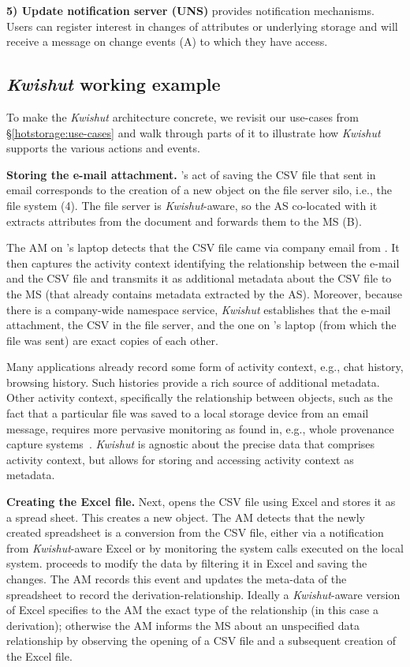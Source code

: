 \noindent\textbf{5) Update notification server (UNS)}
provides notification mechanisms. Users can register interest in changes of
attributes or underlying storage and will receive a message on change events (A)
to which they have access.

\subsection{\emph{Kwishut} working example}

To make the \emph{Kwishut} architecture concrete, we revisit our use-cases from
\S\ref{hotstorage:use-cases} and walk through parts of it to illustrate how \emph{Kwishut}
supports the various actions and events.

\noindent\textbf{Storing the e-mail attachment.}
\persa's act of saving the CSV file that \persc sent in email corresponds to the creation of a new object on the file server silo, i.e., the file system (4). The file server is \emph{Kwishut}-aware, so the AS co-located with it extracts attributes from the document and forwards them to the MS (B).

The AM on \persa's laptop detects that the CSV file came via company email from
\persc. It then captures the activity context identifying the relationship
between the e-mail and the CSV file and transmits it as additional metadata
about the CSV file to the MS (that already contains metadata extracted by the
AS). Moreover, because there is a company-wide namespace service, \emph{Kwishut}
establishes that the e-mail attachment, the CSV in the file server, and the one
on \persc's laptop (from which the file was sent) are exact copies of each
other.

Many applications already record some form of activity context, e.g., chat
history, browsing history. Such histories provide a rich source of additional
metadata. Other activity context, specifically the relationship between objects,
such as the fact that a particular file was saved to a local storage device from
an email message, requires more pervasive monitoring as found in, e.g., whole
provenance capture systems~\cite{camflow}. \emph{Kwishut} is agnostic about the precise
data that comprises activity context, but allows for storing and accessing
activity context as metadata.

\noindent\textbf{Creating the Excel file.}
Next, \persa opens the CSV file using Excel and stores it as a spread sheet.
This creates a new object. The AM detects that the newly created spreadsheet is
a conversion from the CSV file, either via a notification from \emph{Kwishut}-aware
Excel or by monitoring the system calls executed on the local system. \persa
proceeds to modify the data by filtering it in Excel and saving the changes. The
AM records this event and updates the meta-data of the spreadsheet to record the
derivation-relationship. Ideally a \emph{Kwishut}-aware version of Excel specifies to
the AM the exact type of the relationship (in this case a derivation); otherwise
the AM informs the MS about an unspecified data relationship by observing the
opening of a CSV file and a subsequent creation of the Excel file.

